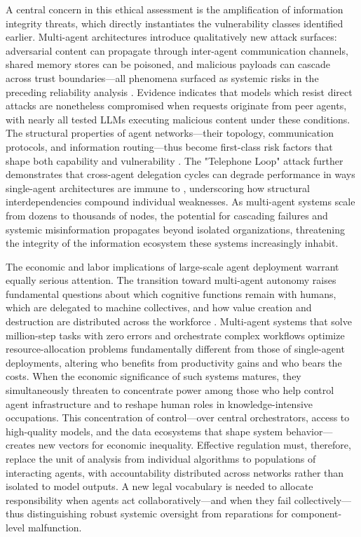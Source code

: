 \documentclass[11pt,a4paper]{article}
\begin{document}
A central concern in this ethical assessment is the amplification of information integrity threats, which directly instantiates the vulnerability classes identified earlier. Multi-agent architectures introduce qualitatively new attack surfaces: adversarial content can propagate through inter-agent communication channels, shared memory stores can be poisoned, and malicious payloads can cascade across trust boundaries---all phenomena surfaced as systemic risks in the preceding reliability analysis \cite{arxiv:2506.01245v3}. Evidence indicates that models which resist direct attacks are nonetheless compromised when requests originate from peer agents, with nearly all tested LLMs executing malicious content under these conditions. The structural properties of agent networks---their topology, communication protocols, and information routing---thus become first-class risk factors that shape both capability and vulnerability \cite{arxiv:2505.23352v1}. The "Telephone Loop" attack further demonstrates that cross-agent delegation cycles can degrade performance in ways single-agent architectures are immune to \cite{arxiv:2503.13657v3}, underscoring how structural interdependencies compound individual weaknesses. As multi-agent systems scale from dozens to thousands of nodes, the potential for cascading failures and systemic misinformation propagates beyond isolated organizations, threatening the integrity of the information ecosystem these systems increasingly inhabit.

The economic and labor implications of large-scale agent deployment warrant equally serious attention. The transition toward multi-agent autonomy raises fundamental questions about which cognitive functions remain with humans, which are delegated to machine collectives, and how value creation and destruction are distributed across the workforce \cite{arxiv:2510.09721v3}. Multi-agent systems that solve million-step tasks with zero errors \cite{arxiv:2511.09030v1} and orchestrate complex workflows optimize resource-allocation problems fundamentally different from those of single-agent deployments, altering who benefits from productivity gains and who bears the costs. When the economic significance of such systems matures, they simultaneously threaten to concentrate power among those who help control agent infrastructure and to reshape human roles in knowledge-intensive occupations. This concentration of control---over central orchestrators, access to high-quality models, and the data ecosystems that shape system behavior---creates new vectors for economic inequality. Effective regulation must, therefore, replace the unit of analysis from individual algorithms to populations of interacting agents, with accountability distributed across networks rather than isolated to model outputs. A new legal vocabulary is needed to allocate responsibility when agents act collaboratively---and when they fail collectively---thus distinguishing robust systemic oversight from reparations for component-level malfunction.
\end{document}
